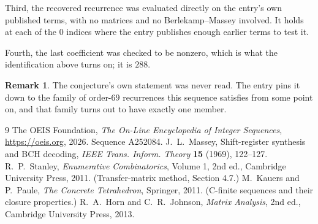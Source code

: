 \documentclass[11pt,a4paper]{article}
\theoremstyle{plain}
\theoremstyle{definition}
\newtheorem{remark}[theorem]{Remark}
\begin{document}
Third, the recovered recurrence was evaluated directly on the entry's own published terms, with
no matrices and no Berlekamp--Massey involved. It holds at each of the $0$ indices where
the entry publishes enough earlier terms to test it.

Fourth, the last coefficient was checked to be nonzero, which is what the identification above
turns on; it is $288$.

\begin{remark}
The conjecture's own statement was never read. The entry pins it down to the family of
order-$69$ recurrences this sequence satisfies from some point on, and that family turns
out to have exactly one member.
\end{remark}

\begin{thebibliography}{9}
 The OEIS Foundation, \emph{The On-Line Encyclopedia of Integer
Sequences}, \url{https://oeis.org}, 2026. Sequence A252084.
 J.~L.~Massey, Shift-register synthesis and BCH decoding, \emph{IEEE
Trans. Inform. Theory} \textbf{15} (1969), 122--127.
 R.~P.~Stanley, \emph{Enumerative Combinatorics}, Volume 1, 2nd ed.,
Cambridge University Press, 2011. (Transfer-matrix method, Section 4.7.)
 M.~Kauers and P.~Paule, \emph{The Concrete Tetrahedron}, Springer, 2011.
(C-finite sequences and their closure properties.)
 R.~A.~Horn and C.~R.~Johnson, \emph{Matrix Analysis}, 2nd ed., Cambridge
University Press, 2013.
\end{thebibliography}
\end{document}
